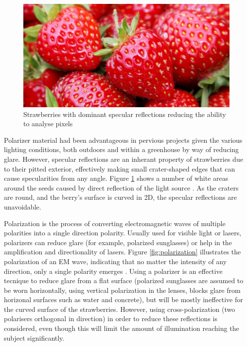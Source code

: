 \documentclass[fleqn,twoside]{article}
\begin{document}
\begin{figure}[h]
	\centering
	\includegraphics[width=.6\linewidth]{strawberry_glare.jpg}
	\caption{Strawberries with dominant specular reflections reducing the ability to analyse pixels}
	\label{fig:strawberry_glare}
\end{figure}%


Polarizer material had been advantageous in pervious projects given the various lighting conditions, both outdoors and within a greenhouse by way of reducing glare. However, specular reflections are an inherant property of strawberries due to their pitted exterior, effectively making small crater-shaped edges that can cause specularities from any angle. Figure \ref{fig:strawberry_glare} shows a number of white areas around the seeds caused by direct reflection of the light source \cite{gurney}. As the craters are round, and the berry's surface is curved in 2D, the specular reflections are unavoidable.

Polarization is the process of converting electromagnetic waves of multiple polarities into a single direction polarity. Usually used for visible light or lasers, polarizers can reduce glare (for example, polarized sunglasses) or help in the amplification and directionality of lasers. Figure \ref{fig:polarization} illustrates the polarization of an EM wave, indicating that no matter the intensity of any direction, only a single polarity emerges  \cite{physicsopenlab}. Using a polarizer is an effective tecnique to reduce glare from a flat surface (polarized sunglasses are assumed to be worn horizontally, using vertical polarization in the lenses, blocks glare from horizonal surfaces such as water and concrete), but will be mostly ineffective for the curved surface of the strawberries. However, using cross-polarization (two polarisers orthogonal in direction) in order to reduce these reflections is considered, even though this will limit the amount of illumination reaching the subject significantly.
\end{document}
